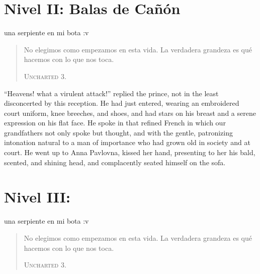 \chapter*{Nivel II: Balas de Cañón} 

 una serpiente en mi bota :v 

\begin{quote} \calli No elegimos como empezamos en esta vida. La verdadera grandeza es qué hacemos con lo que nos toca. 

\textsc{Uncharted 3.}
\end{quote}

``Heavens! what a virulent attack!'' replied the prince, not in
the least disconcerted by this reception. He had just entered,
wearing an embroidered court uniform, knee breeches, and shoes,
and had stars on his breast and a serene expression on his flat
face. He spoke in that refined French in which our grandfathers
not only spoke but thought, and with the gentle, patronizing
intonation natural to a man of importance who had grown old in
society and at court. He went up to Anna Pavlovna, kissed her
hand, presenting to her his bald, scented, and shining head, and
complacently seated himself on the sofa.



\chapter*{Nivel III: } 

 una serpiente en mi bota :v 

\begin{quote} \calli No elegimos como empezamos en esta vida. La verdadera grandeza es qué hacemos con lo que nos toca. 

\textsc{Uncharted 3.}
\end{quote}

